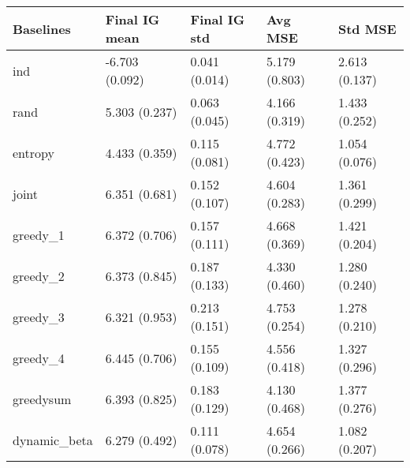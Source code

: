 \begin{tabular}{lllll}
\toprule
    Baselines &   Final IG mean &   Final IG std &        Avg MSE &        Std MSE \\
\midrule
          ind &  -6.703 (0.092) &  0.041 (0.014) &  5.179 (0.803) &  2.613 (0.137) \\
         rand &   5.303 (0.237) &  0.063 (0.045) &  4.166 (0.319) &  1.433 (0.252) \\
      entropy &   4.433 (0.359) &  0.115 (0.081) &  4.772 (0.423) &  1.054 (0.076) \\
        joint &   6.351 (0.681) &  0.152 (0.107) &  4.604 (0.283) &  1.361 (0.299) \\
     greedy\_1 &   6.372 (0.706) &  0.157 (0.111) &  4.668 (0.369) &  1.421 (0.204) \\
     greedy\_2 &   6.373 (0.845) &  0.187 (0.133) &  4.330 (0.460) &  1.280 (0.240) \\
     greedy\_3 &   6.321 (0.953) &  0.213 (0.151) &  4.753 (0.254) &  1.278 (0.210) \\
     greedy\_4 &   6.445 (0.706) &  0.155 (0.109) &  4.556 (0.418) &  1.327 (0.296) \\
    greedysum &   6.393 (0.825) &  0.183 (0.129) &  4.130 (0.468) &  1.377 (0.276) \\
 dynamic\_beta &   6.279 (0.492) &  0.111 (0.078) &  4.654 (0.266) &  1.082 (0.207) \\
\bottomrule
\end{tabular}
